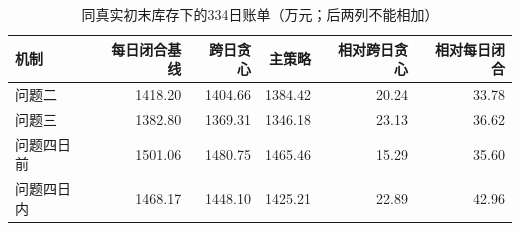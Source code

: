 \begin{table}[H]\centering\small\setlength{\tabcolsep}{3.6pt}
\caption{同真实初末库存下的334日账单（万元；后两列不能相加）}
\begin{tabular}{lrrrrr}
\toprule
机制 & 每日闭合基线 & 跨日贪心 & 主策略 & 相对跨日贪心 & 相对每日闭合 \\
\midrule
问题二 & 1418.20 & 1404.66 & 1384.42 & 20.24 & 33.78 \\
问题三 & 1382.80 & 1369.31 & 1346.18 & 23.13 & 36.62 \\
问题四日前 & 1501.06 & 1480.75 & 1465.46 & 15.29 & 35.60 \\
问题四日内 & 1468.17 & 1448.10 & 1425.21 & 22.89 & 42.96 \\
\bottomrule\end{tabular}\end{table}
